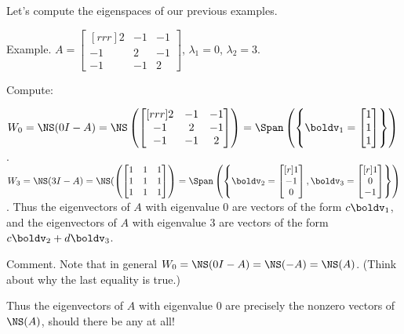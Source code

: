 \begin{frame}
Let's compute the eigenspaces of our previous examples. 

\alert{Example}. $A=\begin{bmatrix}[rrr]
2&-1&-1\\
-1&2&-1\\
-1&-1&2
\end{bmatrix}$, $\lambda_1=0$, $\lambda_2=3$. 
\begin{bsolution}
Compute:

$W_0=\NS(0I-A)=\NS\left(\begin{bmatrix}[rrr]
2&-1&-1\\
-1&2&-1\\
-1&-1&2
\end{bmatrix}
\right)=\Span\left(\left\{\boldv_1=\begin{bmatrix}1 \\ 1 \\ 1 \end{bmatrix}\right\}\right)$. 
\bpause
$W_3=\NS(3I-A)=\NS(\left( \begin{bmatrix} 1&1&1\\ 1&1&1\\ 1&1&1   \end{bmatrix} \right)
=\Span\left(\left\{\boldv_2= \begin{bmatrix}[r] 1 \\ -1 \\ 0 \end{bmatrix}, \boldv_3=\begin{bmatrix}[r]1 \\ 0 \\ -1 \end{bmatrix}\right\}\right)$. 
\bpause
Thus the eigenvectors of $A$ with eigenvalue 0 are vectors of the form $c\boldv_1$, and the eigenvectors of $A$ with eigenvalue 3 are vectors of the form $c\boldv_2+d\boldv_3$. 

\bpause\alert{Comment}. Note that in general $W_0=\NS(0I-A)=\NS(-A)=\NS(A)$. (Think about why the last equality is true.) 

Thus the eigenvectors of $A$ with eigenvalue 0 are precisely the nonzero vectors of $\NS(A)$, should there be any at all!  
\end{bsolution}
\end{frame}

